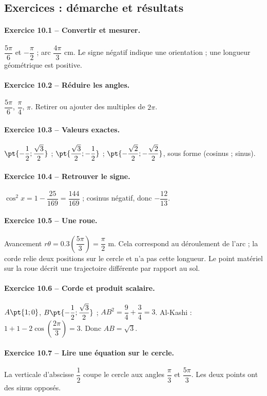 \subsection*{Exercices : démarche et résultats}
\paragraph{Exercice 10.1 -- Convertir et mesurer.} $\dfrac{5\pi}{6}$ et $-\dfrac{\pi}{2}$ ; arc $\dfrac{4\pi}{3}$ cm. Le signe négatif indique une orientation ; une longueur géométrique est positive.
\paragraph{Exercice 10.2 -- Réduire les angles.} $\dfrac{5\pi}{6}$, $\dfrac{\pi}{4}$, $\pi$. Retirer ou ajouter des multiples de $2\pi$.
\paragraph{Exercice 10.3 -- Valeurs exactes.} $\pt{-\dfrac{1}{2};\dfrac{\sqrt 3}{2}}$ ; $\pt{\dfrac{\sqrt 3}{2};-\dfrac{1}{2}}$ ; $\pt{-\dfrac{\sqrt 2}{2};-\dfrac{\sqrt 2}{2}}$, sous forme (cosinus ; sinus).
\paragraph{Exercice 10.4 -- Retrouver le signe.} $\cos ^2x=1-\dfrac{25}{169}=\dfrac{144}{169}$ ; cosinus négatif, donc $-\dfrac{12}{13}$.
\paragraph{Exercice 10.5 -- Une roue.} Avancement $r\theta =\num{0,3}(\dfrac{5\pi}{3})=\dfrac{\pi}{2}$ m. Cela correspond au déroulement de l’arc ; la corde relie deux positions sur le cercle et n’a pas cette longueur. Le point matériel sur la roue décrit une trajectoire différente par rapport au sol.
\paragraph{Exercice 10.6 -- Corde et produit scalaire.} $A\pt{1;0}$, $B\pt{-\dfrac{1}{2};\dfrac{\sqrt 3}{2}}$ ; $AB^2=\dfrac{9}{4}+\dfrac{3}{4}=3$. Al-Kashi : $1+1-2\cos (\dfrac{2\pi}{3})=3$. Donc $AB=\sqrt3$.
\paragraph{Exercice 10.7 -- Lire une équation sur le cercle.} La verticale d’abscisse $\dfrac{1}{2}$ coupe le cercle aux angles $\dfrac{\pi}{3}$ et $\dfrac{5\pi}{3}$. Les deux points ont des sinus opposés.

